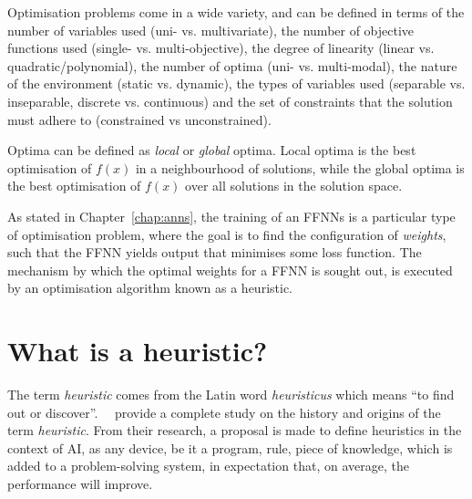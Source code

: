Optimisation problems come in a wide variety, and can be defined in terms of the number of variables used (uni- vs. multivariate), the number of objective functions used (single- vs. multi-objective), the degree of linearity (linear vs. quadratic/polynomial), the number of optima (uni- vs. multi-modal), the nature of the environment (static vs. dynamic), the types of variables used (separable vs. inseparable, discrete vs. continuous) and the set of constraints that the solution must adhere to (constrained vs unconstrained).

Optima can be defined as \textit{local} or \textit{global} optima. Local optima is the best optimisation of $f(x)$ in a neighbourhood of solutions, while the global optima is the best optimisation of $f(x)$ over all solutions in the solution space.

As stated in Chapter~\ref{chap:anns}, the training of an \acp{FFNN} is a particular type of optimisation problem, where the goal is to find the configuration of \textit{weights}, such that the \acs{FFNN} yields output that minimises some loss function. The mechanism by which the optimal weights for a \acs{FFNN} is sought out, is executed by an optimisation algorithm known as a heuristic.

\section{What is a heuristic?}\label{sec:heuristics:what_is_a_heuristic}

The term \textit{heuristic} comes from the Latin word \textit{heuristicus} which means ``to find out or discover''.~\citeauthor{ref:romanycia:1985}~\cite{ref:romanycia:1985} provide a complete study on the history and origins of the term \textit{heuristic}. From their research, a proposal is made to define heuristics in the context of \acf{AI}, as any device, be it a program, rule, piece of knowledge, which is added to a problem-solving system, in expectation that, on average, the performance will improve.

